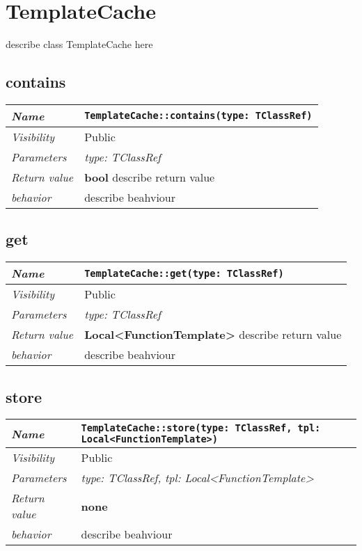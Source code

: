  \chapter{TemplateCache}
describe class TemplateCache here
\section{contains}
\begin{longtable}{p{3cm} @{\hskip 1cm} p{12cm}}
 \hline
\textit{Name} & \texttt{TemplateCache::contains(type: TClassRef)}\\
\hline
 \textit{Visibility} & Public \\
\hline
\textit{Parameters} & \textit{type: TClassRef}\\
\hline
\textit{Return value} & \textbf{ bool} describe return value\\
  \hline
 \textit{behavior} & describe beahviour \\
\hline
\end{longtable} \pagebreak
 \section{get}
\begin{longtable}{p{3cm} @{\hskip 1cm} p{12cm}}
 \hline
\textit{Name} & \texttt{TemplateCache::get(type: TClassRef)}\\
\hline
 \textit{Visibility} & Public \\
\hline
\textit{Parameters} & \textit{type: TClassRef}\\
\hline
\textit{Return value} & \textbf{ Local<FunctionTemplate>} describe return value\\
  \hline
 \textit{behavior} & describe beahviour \\
\hline
\end{longtable} \pagebreak
 \section{store}
\begin{longtable}{p{3cm} @{\hskip 1cm} p{12cm}}
 \hline
\textit{Name} & \texttt{TemplateCache::store(type: TClassRef, tpl: Local<FunctionTemplate>)}\\
\hline
 \textit{Visibility} & Public \\
\hline
\textit{Parameters} & \textit{type: TClassRef, tpl: Local<FunctionTemplate>}\\
\hline
\textit{Return value} & \textbf{none}\\
  \hline
 \textit{behavior} & describe beahviour \\
\hline
\end{longtable} \pagebreak
